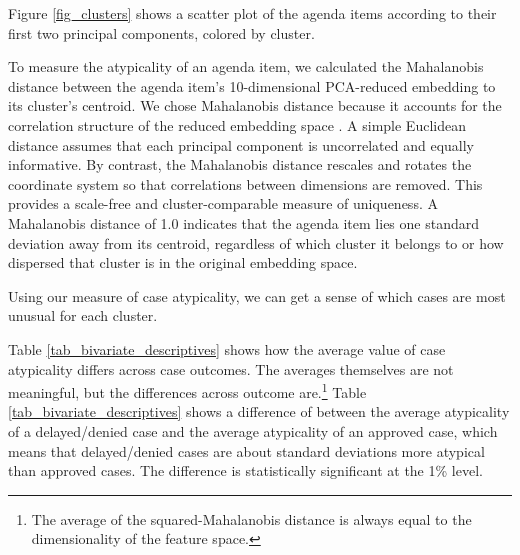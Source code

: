 Figure \ref{fig_clusters} shows a scatter plot of the agenda items according to their first two principal components, colored by cluster. 


To measure the atypicality of an agenda item, we calculated the Mahalanobis distance between the agenda item's 10-dimensional PCA-reduced embedding to its cluster's centroid. We chose Mahalanobis distance because it accounts for the correlation structure of the reduced embedding space \citep[p. 93]{rencher2012}. A simple Euclidean distance assumes that each principal component is uncorrelated and equally informative. By contrast, the Mahalanobis distance rescales and rotates the coordinate system so that correlations between dimensions are removed. This provides a scale-free and cluster-comparable measure of uniqueness. A Mahalanobis distance of 1.0 indicates that the agenda item lies one standard deviation away from its centroid, regardless of which cluster it belongs to or how dispersed that cluster is in the original embedding space.



Using our measure of case atypicality, we can get a sense of which cases are most unusual for each cluster. 


Table \ref{tab_bivariate_descriptives} shows how the average value of case atypicality differs across case outcomes. The averages themselves are not meaningful, but the differences across outcome are.\footnote{The average of the squared-Mahalanobis distance is always equal to the dimensionality of the feature space.} Table \ref{tab_bivariate_descriptives} shows a difference of  between the average atypicality of a delayed/denied case and the average atypicality of an approved case, which means that delayed/denied cases are about  standard deviations more atypical than approved cases. The difference is statistically significant at the 1\% level.

